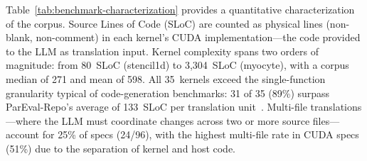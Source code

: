 
Table~\ref{tab:benchmark-characterization} provides a quantitative characterization of the corpus. Source Lines of Code (SLoC) are counted as physical lines (non-blank, non-comment) in each kernel's CUDA implementation---the code provided to the LLM as translation input. Kernel complexity spans two orders of magnitude: from 80~SLoC (stencil1d) to 3{,}304~SLoC (myocyte), with a corpus median of 271 and mean of 598. All 35~kernels exceed the single-function granularity typical of code-generation benchmarks: 31 of 35 (89\%) surpass ParEval-Repo's average of 133~SLoC per translation unit~\cite{ParEvalRepo2025}. Multi-file translations---where the LLM must coordinate changes across two or more source files---account for 25\% of specs (24/96), with the highest multi-file rate in CUDA specs (51\%) due to the separation of kernel and host code.




